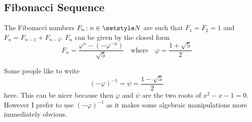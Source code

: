 \subsection{Fibonacci Sequence}

\begin{theorem}
 The Fibonacci numbers \(F_n \colon n \in \Naturals\) are such that
 \(F_1 = F_2 = 1\) and \(F_n = F_{n - 1} + F_{n - 2}\).  \(F_n\) can be given
 by the closed form
 \begin{equation*}
  F_n = \frac{\varphi^n - (-\varphi^{-n})}{\sqrt 5}
  \quad \text{where}\quad \varphi = \frac{1 + \sqrt 5} 2
 \end{equation*}
\end{theorem}
Some people like to write
\begin{equation*}
 (-\varphi)^{-1} = \psi = \frac{1 - \sqrt 5}2
\end{equation*}
here. This can be nicer because then \(\varphi\) and \(\psi\) are the two
roots of \(x^2 - x - 1 = 0\). However I prefer to use \((-\varphi)^{-1}\) as
it makes some algebraic manipulations more immediately obvious.
